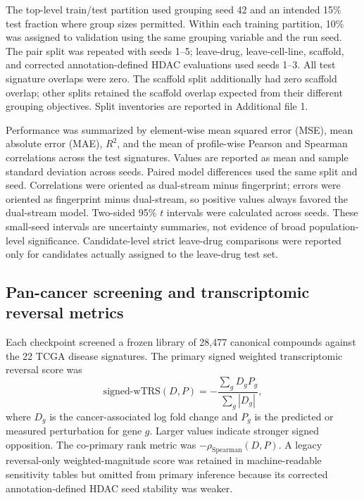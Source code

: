 \begin{minorrevision}
The top-level train/test partition used grouping seed 42 and an intended 15\% test fraction where group sizes permitted. Within each training partition, 10\% was assigned to validation using the same grouping variable and the run seed. The pair split was repeated with seeds 1--5; leave-drug, leave-cell-line, scaffold, and corrected annotation-defined HDAC evaluations used seeds 1--3. All test signature overlaps were zero. The scaffold split additionally had zero scaffold overlap; other splits retained the scaffold overlap expected from their different grouping objectives. Split inventories are reported in Additional file 1.\par
\end{minorrevision}

Performance was summarized by element-wise mean squared error (MSE), mean absolute error (MAE), $R^2$, and the mean of profile-wise Pearson and Spearman correlations across the test signatures. Values are reported as mean and sample standard deviation across seeds. Paired model differences used the same split and seed. Correlations were oriented as dual-stream minus fingerprint; errors were oriented as fingerprint minus dual-stream, so positive values always favored the dual-stream model. Two-sided 95\% $t$ intervals were calculated across seeds. These small-seed intervals are uncertainty summaries, not evidence of broad population-level significance. Candidate-level strict leave-drug comparisons were reported only for candidates actually assigned to the leave-drug test set.

\subsection{Pan-cancer screening and transcriptomic reversal metrics}

Each checkpoint screened a frozen library of 28,477 canonical compounds against the 22 TCGA disease signatures. The primary signed weighted transcriptomic reversal score was
\begin{equation}
\mathrm{signed\mbox{-}wTRS}(D,P)=-\frac{\sum_g D_gP_g}{\sum_g |D_g|},
\end{equation}
where $D_g$ is the cancer-associated log fold change and $P_g$ is the predicted or measured perturbation for gene $g$. Larger values indicate stronger signed opposition. The co-primary rank metric was $-\rho_{\mathrm{Spearman}}(D,P)$. A legacy reversal-only weighted-magnitude score was retained in machine-readable sensitivity tables but omitted from primary inference because its corrected annotation-defined HDAC seed stability was weaker.

